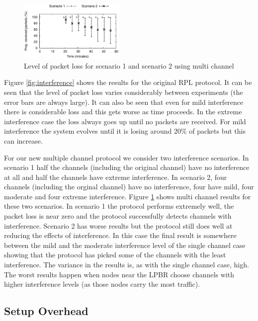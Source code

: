 \begin{figure}
\centering
\includegraphics[width=0.45\textwidth]{experiments/multi_channel.eps}
\caption{Level of packet loss for scenario 1 and scenario 2 using multi channel}
\label{fig:multi_interference}
\end{figure}

Figure \ref{fig:interference} shows the results for the original RPL protocol.
It can be seen that the level of packet loss varies considerably between experiments
(the error bars are always large).  It can also be seen that even for mild 
interference there is considerable loss and this gets worse as time proceeds.
In the extreme interference case the loss always goes up until no packets are received.
For mild interference the system evolves until it is losing around 20\% of
packets but this can increase.

For our new multiple channel protocol we consider two interference scenarios.
In scenario 1 half the channels (including the original channel) have no
interference at all and half the channels have extreme interference.
In scenario 2, four channels (including the orginal channel) have no
interference, four have mild, four moderate and four extreme interference.
Figure \ref{fig:multi_interference} shows multi channel results for these
two scenarios.  In scenario 1 the protocol performs extremely well, the packet
loss is near zero and the protocol successfully detects channels with interference.
Scenario 2 has worse results but the protocol still does well at reducing the
effects of interference.  In this case the final result is somewhere between
the mild and the moderate interference level of the single channel case
showing that the protocol has picked some of the channels with the least interference.
The variance in the results is, as with the single channel case, high.  The worst
results happen when nodes near the LPBR choose channels with higher interference
levels (as those nodes carry the most traffic).


\subsection{Setup Overhead}

